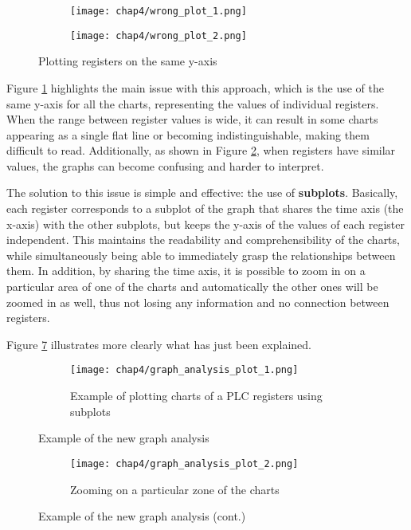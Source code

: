 \begin{figure}[H]
	\centering
	\begin{subfigure}{0.48\textwidth}
		\texttt{[image: chap4/wrong\_plot\_1.png]}
		\caption{}
		\label{subfig:4_wrong_plot}
	\end{subfigure}
	\hfill
	\begin{subfigure}{0.48\textwidth}
		\texttt{[image: chap4/wrong\_plot\_2.png]}
		\caption{}
		\label{subfig:4_wrong_plot_zoom}
	\end{subfigure}
	\caption{Plotting registers on the same y-axis}
	\label{fig:4_plot_comparison_1}
\end{figure}
Figure \ref{subfig:4_wrong_plot} highlights the main issue with this approach, which is the use of the same y-axis for all the charts, representing the values of individual registers. When the range between register values is wide, it can result in some charts appearing as a single flat line or becoming indistinguishable, making them difficult to read. Additionally, as shown in Figure \ref{subfig:4_wrong_plot_zoom}, when registers have similar values, the graphs can become confusing and harder to interpret.

\bigskip
The solution to this issue is simple and effective: the use of \textbf{subplots}. Basically, each register corresponds to a subplot of the graph that shares the time axis (the x-axis) with the other subplots, but keeps the y-axis of the values of each register independent. This maintains the readability and comprehensibility of the charts, while simultaneously being able to immediately grasp the relationships between them. In addition, by sharing the time axis, it is possible to zoom in on a particular area of one of the charts and automatically the other ones will be zoomed in as well, thus not losing any information and no connection between registers. 

\bigskip
\noindent Figure \ref{fig:4_graph_analysis} illustrates more clearly what has just been explained. %

\begin{figure}[H]
	\centering
	\begin{subfigure}{0.9\textwidth}
		\texttt{[image: chap4/graph\_analysis\_plot\_1.png]}
		\caption{Example of plotting charts of a PLC registers using subplots}
		\label{subfig:4_graph_analysis_1}
	\end{subfigure}
	\hfill
	\caption{Example of the new graph analysis}
\end{figure}
\begin{figure}[H]\ContinuedFloat
	\begin{subfigure}{0.9\textwidth}
		\texttt{[image: chap4/graph\_analysis\_plot\_2.png]}
		\caption{Zooming on a particular zone of the charts}
		\label{subfig:4_graph_analysis_2}
	\end{subfigure}
	\caption{Example of the new graph analysis (cont.)}
	\label{fig:4_graph_analysis}
\end{figure}

